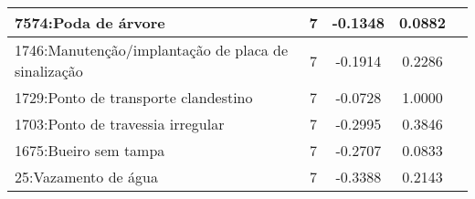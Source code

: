 \begin{table}[htbp]
\begin{tabular}{|l|c|c|c|c|}
		\hline
		7574:Poda de árvore                                 & 7                & -0.1348        & 0.0882           \\
		\hline
		1746:Manutenção/implantação de placa de sinalização & 7                & -0.1914        & 0.2286           \\
		\hline
		1729:Ponto de transporte clandestino                & 7                & -0.0728        & 1.0000           \\
		\hline
		1703:Ponto de travessia irregular                   & 7                & -0.2995        & 0.3846           \\
		\hline
		1675:Bueiro sem tampa                               & 7                & -0.2707        & 0.0833           \\
		\hline
		25:Vazamento de água                                & 7                & -0.3388        & 0.2143           \\
		\hline
	\end{tabular}
\end{table}

